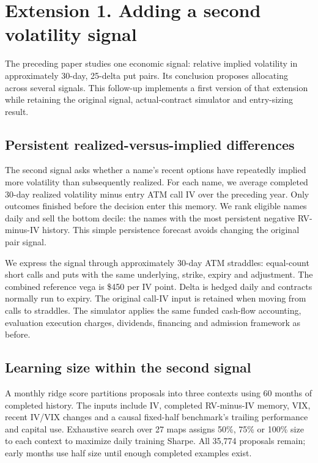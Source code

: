 \clearpage
\normalsize
\renewcommand{\thefigure}{E\arabic{figure}}
\setcounter{figure}{0}
\section*{Extension 1. Adding a second volatility signal}
The preceding paper studies one economic signal: relative implied volatility in approximately 30-day, 25-delta put pairs. Its conclusion proposes allocating across several signals. This follow-up implements a first version of that extension while retaining the original signal, actual-contract simulator and entry-sizing result.

\subsection*{Persistent realized-versus-implied differences}
The second signal asks whether a name's recent options have repeatedly implied more volatility than subsequently realized. For each name, we average completed 30-day realized volatility minus entry ATM call IV over the preceding year. Only outcomes finished before the decision enter this memory. We rank eligible names daily and sell the bottom decile: the names with the most persistent negative RV-minus-IV history. This simple persistence forecast avoids changing the original pair signal.

We express the signal through approximately 30-day ATM straddles: equal-count short calls and puts with the same underlying, strike, expiry and adjustment. The combined reference vega is \$450 per IV point. Delta is hedged daily and contracts normally run to expiry. The original call-IV input is retained when moving from calls to straddles. The simulator applies the same funded cash-flow accounting, evaluation execution charges, dividends, financing and admission framework as before.

\subsection*{Learning size within the second signal}
A monthly ridge score partitions proposals into three contexts using 60 months of completed history. The inputs include IV, completed RV-minus-IV memory, VIX, recent IV/VIX changes and a causal fixed-half benchmark's trailing performance and capital use. Exhaustive search over 27 maps assigns 50\%, 75\% or 100\% size to each context to maximize daily training Sharpe. All 35,774 proposals remain; early months use half size until enough completed examples exist.

